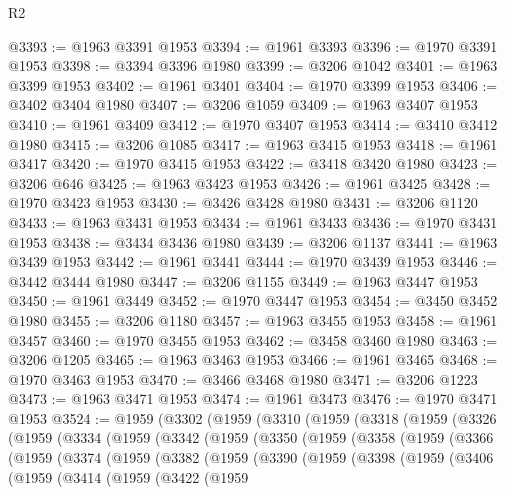 \begin{lexlean}{R2}
\begin{coremodule}
@3393 := @1963 @3391 @1953
@3394 := @1961 @3393
@3396 := @1970 @3391 @1953
@3398 := @3394 @3396 @1980
@3399 := @3206 @1042
@3401 := @1963 @3399 @1953
@3402 := @1961 @3401
@3404 := @1970 @3399 @1953
@3406 := @3402 @3404 @1980
@3407 := @3206 @1059
@3409 := @1963 @3407 @1953
@3410 := @1961 @3409
@3412 := @1970 @3407 @1953
@3414 := @3410 @3412 @1980
@3415 := @3206 @1085
@3417 := @1963 @3415 @1953
@3418 := @1961 @3417
@3420 := @1970 @3415 @1953
@3422 := @3418 @3420 @1980
@3423 := @3206 @646
@3425 := @1963 @3423 @1953
@3426 := @1961 @3425
@3428 := @1970 @3423 @1953
@3430 := @3426 @3428 @1980
@3431 := @3206 @1120
@3433 := @1963 @3431 @1953
@3434 := @1961 @3433
@3436 := @1970 @3431 @1953
@3438 := @3434 @3436 @1980
@3439 := @3206 @1137
@3441 := @1963 @3439 @1953
@3442 := @1961 @3441
@3444 := @1970 @3439 @1953
@3446 := @3442 @3444 @1980
@3447 := @3206 @1155
@3449 := @1963 @3447 @1953
@3450 := @1961 @3449
@3452 := @1970 @3447 @1953
@3454 := @3450 @3452 @1980
@3455 := @3206 @1180
@3457 := @1963 @3455 @1953
@3458 := @1961 @3457
@3460 := @1970 @3455 @1953
@3462 := @3458 @3460 @1980
@3463 := @3206 @1205
@3465 := @1963 @3463 @1953
@3466 := @1961 @3465
@3468 := @1970 @3463 @1953
@3470 := @3466 @3468 @1980
@3471 := @3206 @1223
@3473 := @1963 @3471 @1953
@3474 := @1961 @3473
@3476 := @1970 @3471 @1953
@3524 := @1959
    (@3302
      (@1959
        (@3310
          (@1959
            (@3318
              (@1959
                (@3326
                  (@1959
                    (@3334
                      (@1959
                        (@3342
                          (@1959
                            (@3350
                              (@1959
                                (@3358
                                  (@1959
                                    (@3366
                                      (@1959
                                        (@3374
                                          (@1959
                                            (@3382
                                              (@1959
                                                (@3390
                                                  (@1959
                                                    (@3398
                                                      (@1959
                                                        (@3406
                                                          (@1959
                                                            (@3414
                                                              (@1959
                                                                (@3422
                                                                  (@1959

\end{coremodule}
\end{lexlean}
